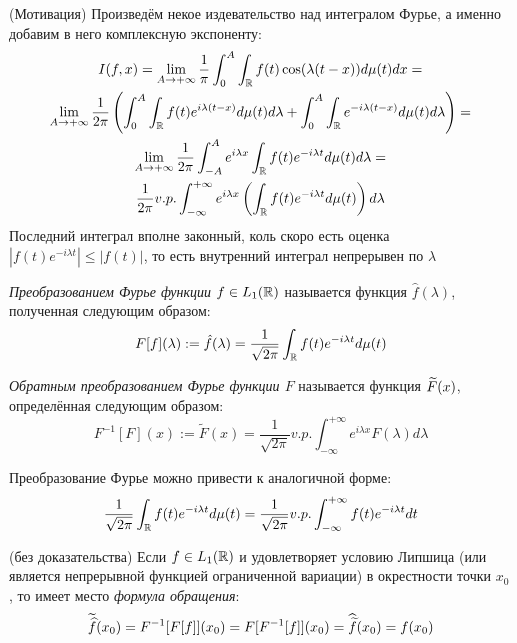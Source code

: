 \begin{note} (Мотивация)
	Произведём некое издевательство над интегралом Фурье, а именно добавим в него комплексную экспоненту:
	\begin{multline*}
		I(f, x) = \lim_{A \to +\infty} \frac{1}{\pi} \int_0^A \int_{\mathbb{R}} f(t)\cos(\lambda(t - x))d\mu(t)dx =
		\\
		\lim_{A \to +\infty} \frac{1}{2\pi} \left(\int_0^A \int_{\mathbb{R}} f(t)e^{i\lambda(t - x)}d\mu(t)d\lambda + \int_0^A \int_{\mathbb{R}} e^{-i\lambda(t - x)}d\mu(t)d\lambda\right) =
		\\
		\lim_{A \to +\infty} \frac{1}{2\pi} \int_{-A}^A e^{i\lambda x} \int_{\mathbb{R}} f(t)e^{-i\lambda t}d\mu(t)d\lambda =
		\\
		\frac{1}{2\pi} v.p. \int_{-\infty}^{+\infty} e^{i\lambda x}\left(\int_{\mathbb{R}} f(t)e^{-i\lambda t}d\mu(t)\right)d\lambda
	\end{multline*}
	Последний интеграл вполне законный, коль скоро есть оценка $|f(t)e^{-i\lambda t}| \le |f(t)|$, то есть внутренний интеграл непрерывен по $\lambda$
\end{note}

\begin{definition}
	\textit{Преобразованием Фурье функции $f \in L_1(\mathbb{R})$} называется функция $\hat{f}(\lambda)$, полученная следующим образом:
	\[
		F[f](\lambda) := \hat{f}(\lambda) = \frac{1}{\sqrt{2\pi}} \int_{\mathbb{R}} f(t)e^{-i\lambda t}d\mu(t)
	\]
\end{definition}

\begin{definition}
	\textit{Обратным преобразованием Фурье функции $F$} называется функция $\widetilde{F}(x)$, определённая следующим образом:
	\[
		F^{-1}[F](x) := \widetilde{F}(x) = \frac{1}{\sqrt{2\pi}} v.p. \int_{-\infty}^{+\infty} e^{i\lambda x}F(\lambda)d\lambda
	\]
\end{definition}

\begin{note}
	Преобразование Фурье можно привести к аналогичной форме:
	\[
		\frac{1}{\sqrt{2\pi}} \int_{\mathbb{R}} f(t)e^{-i\lambda t}d\mu(t) = \frac{1}{\sqrt{2\pi}} v.p. \int_{-\infty}^{+\infty} f(t)e^{-i\lambda t}dt
	\]
\end{note}

\begin{proposition} (без доказательства)
	Если $f \in L_1(\mathbb{R})$ и удовлетворяет условию Липшица (или является непрерывной функцией ограниченной вариации) в окрестности точки $x_0$, то имеет место \textit{формула обращения}:
	\[
		\widetilde{\widehat{f}}(x_0) = F^{-1}[F[f]](x_0) = F[F^{-1}[f]](x_0) = \widehat{\widetilde{f}}(x_0) = f(x_0)
	\]
\end{proposition}

